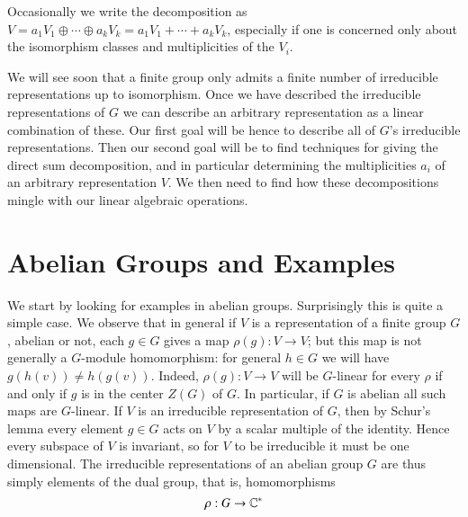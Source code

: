 Occasionally we write the decomposition as $V = a_1V_1\oplus\cdots\oplus a_kV_k = a_1V_1+\cdots+a_kV_k$, especially if one is concerned only about the isomorphism classes and multiplicities of the $V_i$.

We will see soon that a finite group only admits a finite number of irreducible representations up to isomorphism. Once we have described the irreducible representations of $G$ we can describe an arbitrary representation as a linear combination of these. Our first goal will be hence to describe all of $G$'s irreducible representations. Then our second goal will be to find techniques for giving the direct sum decomposition, and in particular determining the multiplicities $a_i$ of an arbitrary representation $V$. We then need to find how these decompositions mingle with our linear algebraic operations. 

\section{Abelian Groups and Examples}

We start by looking for examples in abelian groups. Surprisingly this is quite a simple case. We observe that in general if $V$ is a representation of a finite group $G$, abelian or not, each $g \in G$ gives a map $\rho(g):V\rightarrow V$; but this map is not generally a $G$-module homomorphism: for general $h \in G$ we will have $g(h(v)) \neq h(g(v))$. Indeed, $\rho(g):V\rightarrow V$ will be $G$-linear for every $\rho$ if and only if $g$ is in the center $Z(G)$ of $G$. In particular, if $G$ is abelian all such maps are $G$-linear. If $V$ is an irreducible representation of $G$, then by Schur's lemma every element $g \in G$ acts on $V$ by a scalar multiple of the identity. Hence every subspace of $V$ is invariant, so for $V$ to be irreducible it must be one dimensional. The irreducible representations of an abelian group $G$ are thus simply elements of the dual group, that is, homomorphisms $$\rho:G\rightarrow \mathbb C^*$$

